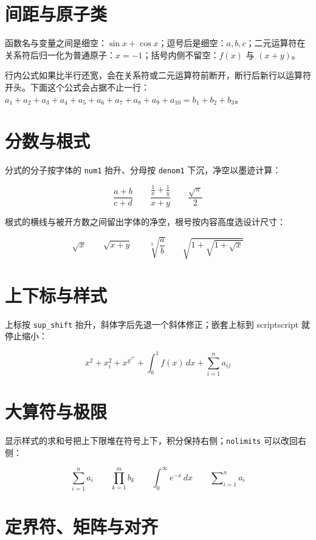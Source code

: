 \section{间距与原子类}

函数名与变量之间是细空：$\sin x + \cos x$；逗号后是细空：$a,b,c$；二元运算符在关系符后归一化为普通原子：$x = -1$；括号内侧不留空：$f(x)$ 与 $\left(x+y\right)$。

行内公式如果比半行还宽，会在关系符或二元运算符前断开，断行后新行以运算符开头。下面这个公式会占据不止一行：$a_1 + a_2 + a_3 + a_4 + a_5 + a_6 + a_7 + a_8 + a_9 + a_{10} = b_1 + b_2 + b_3$。

\section{分数与根式}

分式的分子按字体的 \texttt{num1} 抬升、分母按 \texttt{denom1} 下沉，净空以墨迹计算：

\[
\frac{a+b}{c+d} \qquad \frac{\frac{1}{x}+\frac{1}{y}}{x+y} \qquad \frac{\sqrt{\pi}}{2}
\]

根式的横线与被开方数之间留出字体的净空，根号按内容高度选设计尺寸：

\[
\sqrt{x} \qquad \sqrt{x+y} \qquad \sqrt[3]{\frac{a}{b}} \qquad \sqrt{1+\sqrt{1+\sqrt{x}}}
\]

\section{上下标与样式}

上标按 \texttt{sup\_shift} 抬升，斜体字后先退一个斜体修正；嵌套上标到 scriptscript 就停止缩小：

\[
x^2 + x_i^2 + x^{y^{z^{w}}} + \int_0^1 f(x)\,dx + \sum_{i=1}^{n} a_{ij}
\]

\section{大算符与极限}

显示样式的求和号把上下限堆在符号上下，积分保持右侧；\texttt{nolimits} 可以改回右侧：

\[
\sum_{i=1}^{n} a_i \qquad \prod_{k=1}^{m} b_k \qquad \int_0^\infty e^{-x}\,dx \qquad \sum\nolimits_{i=1}^{n} a_i
\]

\section{定界符、矩阵与对齐}

